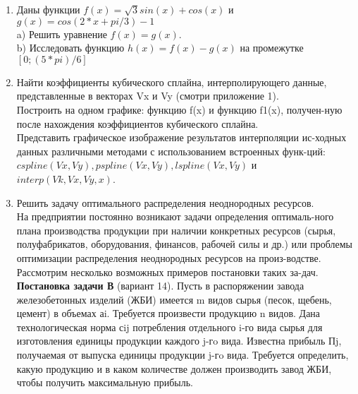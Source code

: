 \documentclass[14pt]{extreport}
\begin{document}
\begin{enumerate}
\item\footnotesize {Даны функции $f(x) = \sqrt{3}sin(x) + cos(x)$ и $g(x) = cos(2*x + pi/3) - 1$\\
a)	Решить уравнение $f(x) = g(x)$.\\
b)	Исследовать функцию $h(x) = f(x) - g(x)$ на промежутке $[0 ; (5*pi)/6]$}\\
\item Найти коэффициенты кубического сплайна, интерполирующего данные, представленные в векторах Vx и Vy (смотри приложение 1). \\
Построить на одном графике: функцию f(x) и функцию f1(x), получен-ную после нахождения коэффициентов кубического сплайна.\\
Представить графическое изображение результатов интерполяции ис-ходных данных различными методами с использованием встроенных функ-ций:\\
$cspline(Vx,Vy), pspline(Vx,Vy), lspline(Vx,Vy)$ и $interp(Vk,Vx,Vy,x)$.

\item Решить задачу оптимального распределения неоднородных ресурсов.\\
На предприятии постоянно возникают задачи определения оптималь-ного плана производства продукции при наличии конкретных ресурсов (сырья, полуфабрикатов, оборудования, финансов, рабочей силы и др.) или проблемы оптимизации распределения неоднородных ресурсов на произ-водстве. Рассмотрим несколько возможных примеров постановки таких за-дач.\\
\textbf{Постановка задачи В} (вариант 14). Пусть в распоряжении завода железобетонных изделий (ЖБИ) имеется m видов сырья (песок, щебень, цемент) в объемах аi. Требуется произвести продукцию n видов. Дана технологическая норма сij потребления отдельного i-го вида сырья для изготовления единицы продукции каждого j-гo вида. Известна прибыль Пj, получаемая от выпуска единицы продукции j-гo вида. Требуется определить, какую продукцию и в каком количестве должен производить завод ЖБИ, чтобы получить максимальную прибыль.
\end{enumerate}

\newpage
\end{document}
